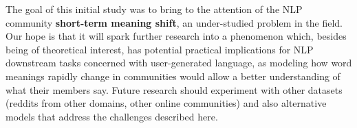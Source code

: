 
The goal of this initial study was to bring to the attention of the NLP community {\bf short-term meaning shift}, an under-studied problem in the field. 
Our hope is that it will spark further research into a phenomenon which, besides being of theoretical interest, has potential practical implications for NLP downstream tasks concerned with user-generated language, as modeling how word meanings rapidly change in communities would allow a better understanding of what their members say.
Future research should experiment with other datasets (reddits from other domains, other online communities) and also alternative models that address the challenges described here.

